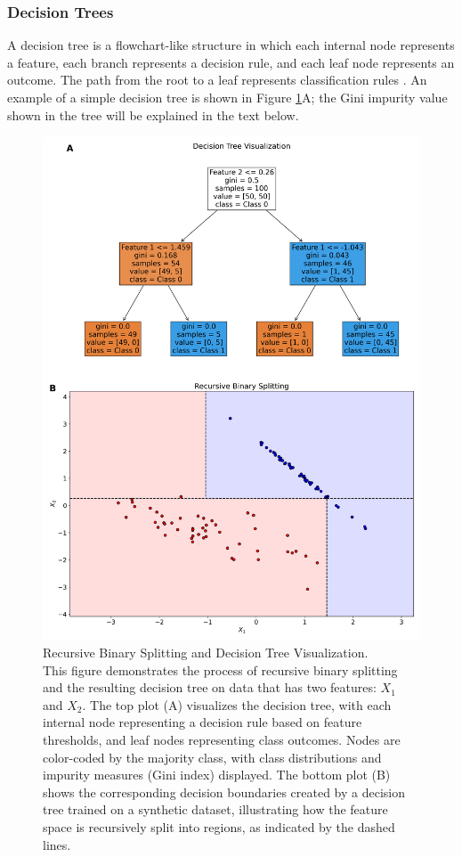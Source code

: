 \documentclass[english,11pt,a4paper,titlepage]{article}
\begin{document}
	\subsubsection*{Decision Trees}
	A decision tree is a flowchart-like structure in which each internal node represents a feature, each branch represents a decision rule, and each leaf node represents an outcome. The path from the root to a leaf represents classification rules \cite{hastieElementsStatisticalLearning2009}. An example of a simple decision tree is shown in Figure \ref{fig:decisiontreevisualization}A; the Gini impurity value shown in the tree will be explained in the text below.
	
	\begin{figure}[t!]
		\centering
		\includegraphics[width=0.9\linewidth]{img/decision_tree}
		\caption{Recursive Binary Splitting and Decision Tree Visualization. \\ This figure demonstrates the process of recursive binary splitting and the resulting decision tree on data that has two features: $X_1$ and $X_2$. The top plot (A) visualizes the decision tree, with each internal node representing a decision rule based on feature thresholds, and leaf nodes representing class outcomes. Nodes are color-coded by the majority class, with class distributions and impurity measures (Gini index) displayed. The bottom plot (B) shows the corresponding decision boundaries created by a decision tree trained on a synthetic dataset, illustrating how the feature space is recursively split into regions, as indicated by the dashed lines. }
		\label{fig:decisiontreevisualization}
	\end{figure}
	
\end{document}
